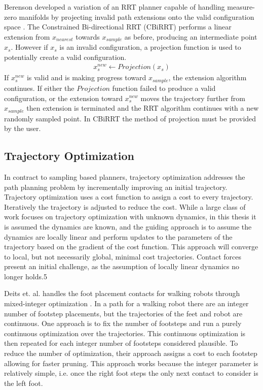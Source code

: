 \documentclass[../thesis.tex]{subfiles}
\begin{document}
Berenson developed a variation of an RRT planner capable of handling measure-zero manifolds by projecting invalid path extensions onto the valid configuration space \cite{Berenson2009a}.
The Constrained Bi-directional RRT (CBiRRT) performs a linear extension from $x_{nearest}$ towards $x_{sample}$ as before, producing an intermediate point $x_s$.
However if $x_s$ is an invalid configuration, a projection function is used to potentially create a valid configuration.
\begin{align}
  x_s^{new} \leftarrow Projection(x_s)
\end{align}
If $x_s^{new}$ is valid and is making progress toward $x_{sample}$, the extension algorithm continues.
If either the $Projection$ function failed to produce a valid configuration, or the extension toward $x_s^{new}$ moves the trajectory further from $x_{sample}$ then extension is terminated and the RRT algorithm continues with a new randomly sampled point.
In CBiRRT the method of projection must be provided by the user. 




\subsection{Trajectory Optimization}
In contract to sampling based planners, trajectory optimization addresses the path planning problem by incrementally improving an initial trajectory.
Trajectory optimization uses a cost function to assign a cost to every trajectory.
Iteratively the trajectory is adjusted to reduce the cost.
While a large class of work focuses on trajectory optimization with unknown dynamics, in this thesis it is assumed the dynamics are known, and the guiding approach is to assume the dynamics are locally linear and perform updates to the parameters of the trajectory based on the gradient of the cost function.
This approach will converge to local, but not necessarily global, minimal cost trajectories.
Contact forces present an initial challenge, as the assumption of locally linear dynamics no longer holds.5

Deits et. al. handles the foot placement contacts for walking robots through mixed-integer optimization \cite{Deits2015}.
In a path for a walking robot there are an integer number of footstep placements, but the trajectories of the feet and robot are continuous.
One approach is to fix the number of footsteps and run a purely continuous optimization over the trajectories.
This continuous optimization is then repeated for each integer number of footsteps considered plausible.
To reduce the number of optimization, their approach assigns a cost to each footstep allowing for faster pruning.
This approach works because the integer parameter is relatively simple, i.e. once the right foot steps the only next contact to consider is the left foot.
\end{document}
